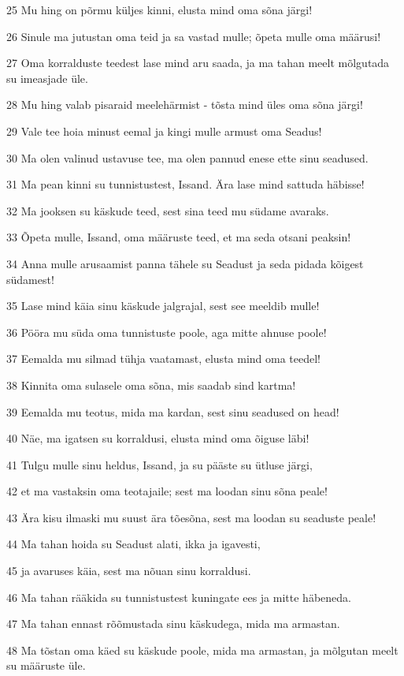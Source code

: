 \par 25 Mu hing on põrmu küljes kinni, elusta mind oma sõna järgi!
\par 26 Sinule ma jutustan oma teid ja sa vastad mulle; õpeta mulle oma määrusi!
\par 27 Oma korralduste teedest lase mind aru saada, ja ma tahan meelt mõlgutada su imeasjade üle.
\par 28 Mu hing valab pisaraid meelehärmist - tõsta mind üles oma sõna järgi!
\par 29 Vale tee hoia minust eemal ja kingi mulle armust oma Seadus!
\par 30 Ma olen valinud ustavuse tee, ma olen pannud enese ette sinu seadused.
\par 31 Ma pean kinni su tunnistustest, Issand. Ära lase mind sattuda häbisse!
\par 32 Ma jooksen su käskude teed, sest sina teed mu südame avaraks.
\par 33 Õpeta mulle, Issand, oma määruste teed, et ma seda otsani peaksin!
\par 34 Anna mulle arusaamist panna tähele su Seadust ja seda pidada kõigest südamest!
\par 35 Lase mind käia sinu käskude jalgrajal, sest see meeldib mulle!
\par 36 Pööra mu süda oma tunnistuste poole, aga mitte ahnuse poole!
\par 37 Eemalda mu silmad tühja vaatamast, elusta mind oma teedel!
\par 38 Kinnita oma sulasele oma sõna, mis saadab sind kartma!
\par 39 Eemalda mu teotus, mida ma kardan, sest sinu seadused on head!
\par 40 Näe, ma igatsen su korraldusi, elusta mind oma õiguse läbi!
\par 41 Tulgu mulle sinu heldus, Issand, ja su pääste su ütluse järgi,
\par 42 et ma vastaksin oma teotajaile; sest ma loodan sinu sõna peale!
\par 43 Ära kisu ilmaski mu suust ära tõesõna, sest ma loodan su seaduste peale!
\par 44 Ma tahan hoida su Seadust alati, ikka ja igavesti,
\par 45 ja avaruses käia, sest ma nõuan sinu korraldusi.
\par 46 Ma tahan rääkida su tunnistustest kuningate ees ja mitte häbeneda.
\par 47 Ma tahan ennast rõõmustada sinu käskudega, mida ma armastan.
\par 48 Ma tõstan oma käed su käskude poole, mida ma armastan, ja mõlgutan meelt su määruste üle.

